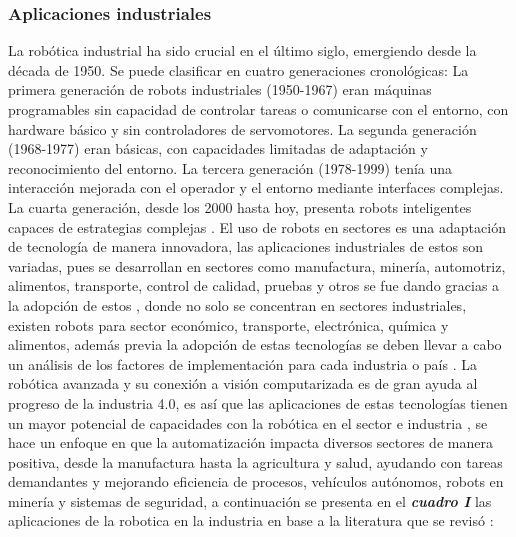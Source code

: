 \documentclass[conference]{IEEEtran}
\begin{document}
\subsubsection{Aplicaciones industriales}
La robótica industrial ha sido crucial en el último siglo, emergiendo desde la década de 1950. Se puede clasificar en cuatro generaciones cronológicas: La primera generación de robots industriales (1950-1967) eran máquinas programables sin capacidad de controlar tareas o comunicarse con el entorno, con hardware básico y sin controladores de servomotores. La segunda generación (1968-1977) eran básicas, con capacidades limitadas de adaptación y reconocimiento del entorno. La tercera generación (1978-1999) tenía una interacción mejorada con el operador y el entorno mediante interfaces complejas. La cuarta generación, desde los 2000 hasta hoy, presenta robots inteligentes capaces de estrategias complejas \cite{Gasparetto2019}.
El uso de robots en sectores es una adaptación de tecnología de manera innovadora, las aplicaciones industriales de estos son variadas, pues se desarrollan en sectores como manufactura, minería, automotriz, alimentos, transporte, control de calidad, pruebas y otros se fue dando gracias a la adopción de estos \cite{Sherwani2020}, donde no solo se concentran en sectores industriales, existen robots para sector económico, transporte, electrónica, química y alimentos, además previa la adopción de estas tecnologías se deben llevar a cabo un análisis de los factores de implementación para cada industria o país \cite{Backer2018}.
La robótica avanzada y su conexión a visión computarizada es de gran ayuda al progreso de la industria 4.0, es así que las aplicaciones de estas tecnologías tienen un mayor potencial de capacidades con la robótica en el sector e industria \cite{Javaid2021}, se hace un enfoque en que la automatización impacta diversos sectores de manera positiva, desde la manufactura hasta la agricultura y salud, ayudando con tareas demandantes y mejorando eficiencia de procesos, vehículos autónomos, robots en minería y sistemas de seguridad, a continuación se presenta en el \textit{\textbf{cuadro I}} las aplicaciones de la robotica en la industria en base a la literatura que se revisó \cite{Goel2020}:
\end{document}

